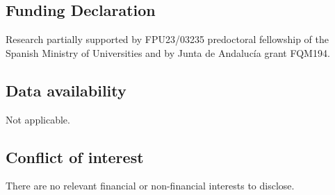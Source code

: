 \documentclass[12pt]{amsart}
\begin{document}
	\subsection*{Funding Declaration} Research partially supported by FPU23/03235 predoctoral fellowship of the Spanish Ministry of Universities and by Junta de Andaluc\'ia grant FQM194.

	\subsection*{Data availability} Not applicable.

	\subsection*{Conflict of interest} There are no relevant financial or non-financial interests to disclose.
\end{document}
